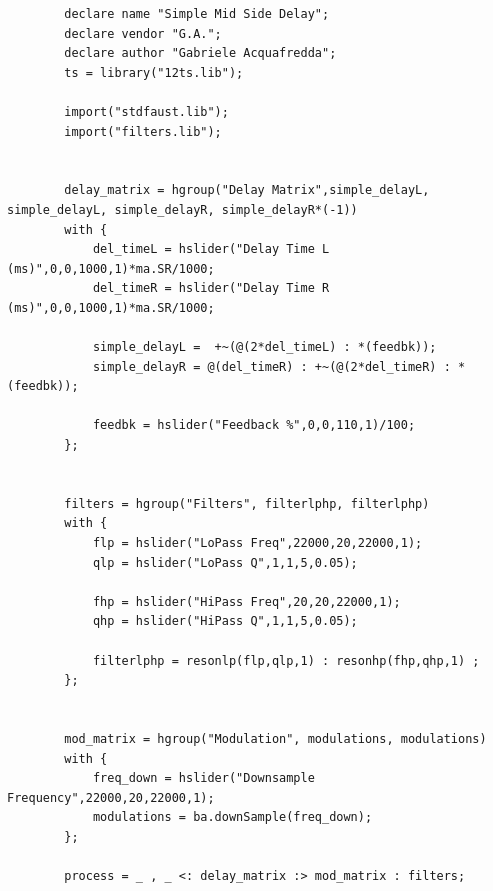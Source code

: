 \documentclass{article}
\begin{document}
    \begin{lstlisting}
        declare name "Simple Mid Side Delay";
        declare vendor "G.A.";
        declare author "Gabriele Acquafredda";
        ts = library("12ts.lib");
        
        import("stdfaust.lib");
        import("filters.lib");
        
        
        delay_matrix = hgroup("Delay Matrix",simple_delayL, simple_delayL, simple_delayR, simple_delayR*(-1))
        with {
            del_timeL = hslider("Delay Time L (ms)",0,0,1000,1)*ma.SR/1000;
            del_timeR = hslider("Delay Time R (ms)",0,0,1000,1)*ma.SR/1000;
            
            simple_delayL =  +~(@(2*del_timeL) : *(feedbk));
            simple_delayR = @(del_timeR) : +~(@(2*del_timeR) : *(feedbk));
            
            feedbk = hslider("Feedback %",0,0,110,1)/100;
        };
        
        
        filters = hgroup("Filters", filterlphp, filterlphp)
        with {
            flp = hslider("LoPass Freq",22000,20,22000,1);
            qlp = hslider("LoPass Q",1,1,5,0.05);
        
            fhp = hslider("HiPass Freq",20,20,22000,1);
            qhp = hslider("HiPass Q",1,1,5,0.05);
        
            filterlphp = resonlp(flp,qlp,1) : resonhp(fhp,qhp,1) ;
        };
        
        
        mod_matrix = hgroup("Modulation", modulations, modulations)
        with {
            freq_down = hslider("Downsample Frequency",22000,20,22000,1);
            modulations = ba.downSample(freq_down);
        };
        
        process = _ , _ <: delay_matrix :> mod_matrix : filters;
    \end{lstlisting}
\end{document}
